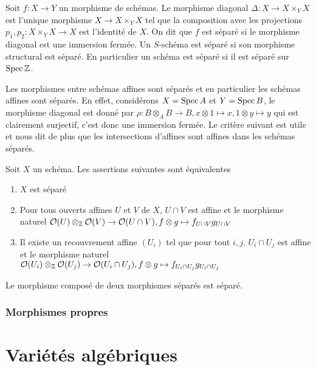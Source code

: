 \begin{defn}
Soit $f:X\rightarrow Y$ un morphisme de schémas. Le morphisme diagonal $\Delta:X\rightarrow X\times_Y X$ est l'unique morphisme $X\rightarrow X\times_Y X$ tel que la composition avec les projections $p_1,p_2:X\times_Y X\rightarrow X$ est l'identité de $X$. On dit que $f$ est séparé si le morphisme diagonal est une immersion fermée.
Un $S$-schéma est séparé si son morphisme structural est séparé. En particulier un schéma est séparé si il est séparé sur $\operatorname{Spec}\mathbb{Z}$.
\end{defn}

Les morphismes entre schémas affines sont séparés et en particulier les schémas affines sont séparés. En effet, considérons $X=\operatorname{Spec} A$ et $Y=\operatorname{Spec} B$, le morphisme diagonal est donné par $\rho: B\otimes_A B\rightarrow B, x\otimes 1\mapsto x, 1\otimes y \mapsto y$ qui est clairement surjectif, c'est donc une immersion fermée. Le critère suivant est utile et nous dit de plus que les intersections d'affines sont affines dans les schémas séparés.

\begin{prop}\label{sepCritere}
Soit $X$ un schéma. Les assertions suivantes sont équivalentes
	\begin{enumerate}
	\item $X$ est séparé
	\item Pour tous ouverts affines $U$ et $V$ de $X$, $U\cap V$ est affine et le morphisme naturel $\mathcal{O}(U)\otimes_{\mathbb{Z}} \mathcal{O}(V)\rightarrow\mathcal{O}(U\cap V), f\otimes g\mapsto f_{U\cap V}g_{U\cap V}$
	\item Il existe un recouvrement affine $(U_i)$ tel que pour tout $i,j$, $U_i\cap U_j$ est affine et le morphisme naturel $\mathcal{O}(U_i)\otimes_{\mathbb{Z}} \mathcal{O}(U_j)\rightarrow\mathcal{O}(U_i\cap U_j), f\otimes g\mapsto f_{U_i\cap U_j}g_{U_i\cap U_j}$
	\end{enumerate}
\end{prop}

\begin{prop}\label{sepCritere2}
Le morphisme composé de deux morphismes séparés est séparé.
\end{prop}


\subsubsection{Morphismes propres}


\section{Variétés algébriques}

